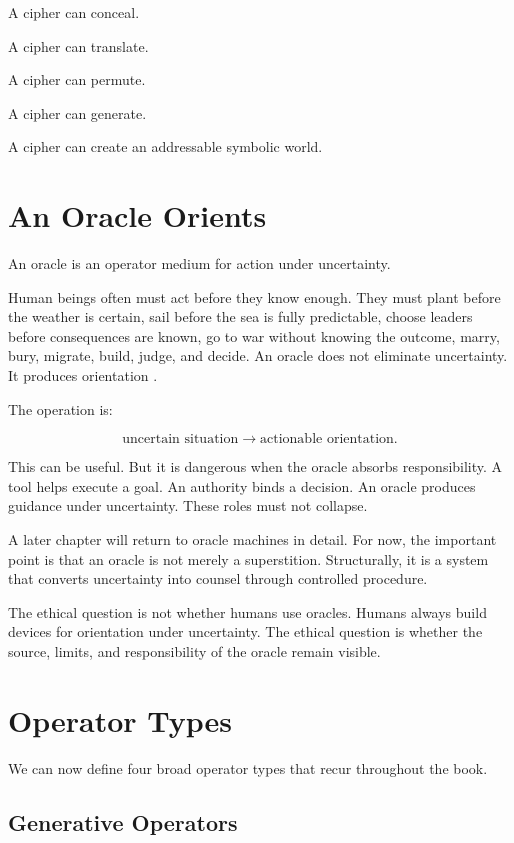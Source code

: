 \documentclass[11pt]{book}
\begin{document}
A cipher can conceal.

A cipher can translate.

A cipher can permute.

A cipher can generate.

A cipher can create an addressable symbolic world.

\section{An Oracle Orients}

An oracle is an operator medium for action under uncertainty.

Human beings often must act before they know enough. They must plant before the weather is certain, sail before the sea is fully predictable, choose leaders before consequences are known, go to war without knowing the outcome, marry, bury, migrate, build, judge, and decide. An oracle does not eliminate uncertainty. It produces orientation \cite{Loewe1994DivinationMythologyMonarchy,Shaughnessy1996IChing,WilhelmBaynes1967IChing,DeeCasaubon1659TrueFaithfulRelation}.

The operation is:

\[
\text{uncertain situation}
\longrightarrow
\text{actionable orientation}.
\]

This can be useful. But it is dangerous when the oracle absorbs responsibility. A tool helps execute a goal. An authority binds a decision. An oracle produces guidance under uncertainty. These roles must not collapse.

A later chapter will return to oracle machines in detail. For now, the important point is that an oracle is not merely a superstition. Structurally, it is a system that converts uncertainty into counsel through controlled procedure.

The ethical question is not whether humans use oracles. Humans always build devices for orientation under uncertainty. The ethical question is whether the source, limits, and responsibility of the oracle remain visible.

\section{Operator Types}

We can now define four broad operator types that recur throughout the book.

\subsection{Generative Operators}
\end{document}
